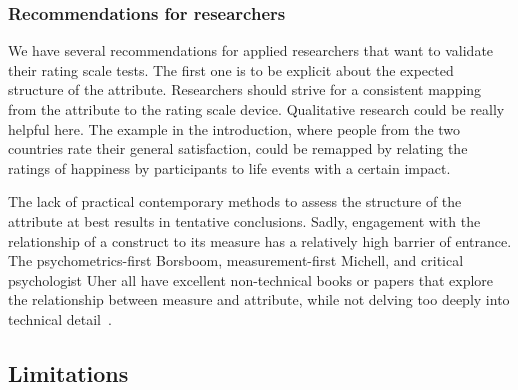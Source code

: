 \documentclass[titlepage, a4paper, 11pt]{article}
\begin{document}
\subsubsection{Recommendations for researchers}
We have several recommendations for applied researchers that want to validate their rating scale tests. The first one is to be explicit about the expected structure of the attribute. Researchers should strive for a consistent mapping from the attribute to the rating scale device. Qualitative research could be really helpful here. The example in the introduction, where people from the two countries rate their general satisfaction, could be remapped by relating the ratings of happiness by participants to life events with a certain impact.

The lack of practical contemporary methods to assess the structure of the attribute at best results in tentative conclusions. Sadly, engagement with the relationship of a construct to its measure has a relatively high barrier of entrance. The psychometrics-first Borsboom, measurement-first Michell, and critical psychologist Uher all have excellent non-technical books or papers that explore the relationship between measure and attribute, while not delving too deeply into technical detail~\citep{borsboom_measuring_2005,michell_introduction_2014, uher_quantitative_2018}. 

\subsection{Limitations}
\end{document}
